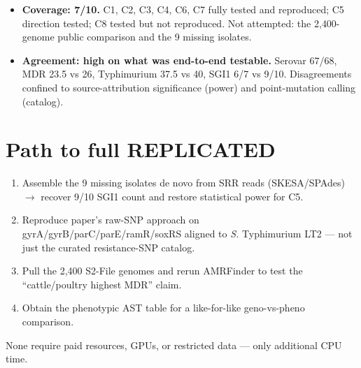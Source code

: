 \documentclass[11pt]{article}
\begin{document}
\begin{itemize}[leftmargin=*]
  \item \textbf{Coverage: 7/10.} C1, C2, C3, C4, C6, C7 fully tested and reproduced; C5 direction tested;
        C8 tested but not reproduced. Not attempted: the 2{,}400-genome public comparison and the 9 missing
        isolates.
  \item \textbf{Agreement: high on what was end-to-end testable.} Serovar 67/68, MDR 23.5 vs 26,
        Typhimurium 37.5 vs 40, SGI1 6/7 vs 9/10. Disagreements confined to source-attribution significance
        (power) and point-mutation calling (catalog).
\end{itemize}

\section{Path to full REPLICATED}

\begin{enumerate}[leftmargin=*]
  \item Assemble the 9 missing isolates de novo from SRR reads (SKESA/SPAdes) $\to$ recover 9/10 SGI1 count
        and restore statistical power for C5.
  \item Reproduce paper's raw-SNP approach on gyrA/gyrB/parC/parE/ramR/soxRS aligned to \emph{S.} Typhimurium
        LT2 --- not just the curated resistance-SNP catalog.
  \item Pull the 2{,}400 S2-File genomes and rerun AMRFinder to test the ``cattle/poultry highest MDR'' claim.
  \item Obtain the phenotypic AST table for a like-for-like geno-vs-pheno comparison.
\end{enumerate}
None require paid resources, GPUs, or restricted data --- only additional CPU time.
\end{document}
